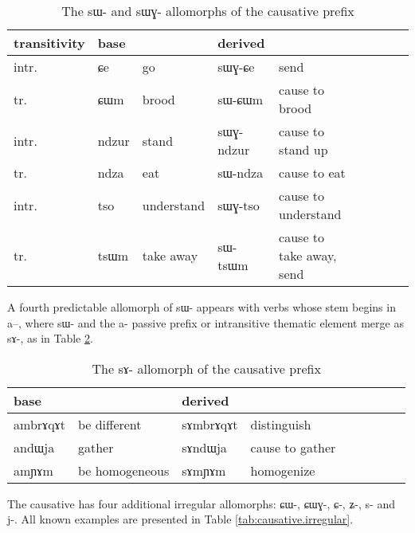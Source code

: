 \documentclass[oldfontcommands,oneside,a4paper,11pt]{article}
\newcommand{\ipa}[1]{{\phon \mbox{#1}}} %
\begin{document}
\begin{table}[h]
\caption{The \ipa{sɯ}- and  \ipa{sɯɣ-} allomorphs of the causative prefix}\label{tab:causative.sW} \centering
\begin{tabular}{lllllllll} \toprule
 transitivity & base & & derived & \\
 \midrule
 intr. & \ipa{ɕe} & go & \ipa{sɯɣ-ɕe} & send \\
  tr. & \ipa{ɕɯm} & brood & \ipa{sɯ-ɕɯm} & cause to brood \\
  intr. & \ipa{ndzur} & stand & \ipa{sɯɣ-ndzur} & cause to stand up \\
  tr. & \ipa{ndza} & eat & \ipa{sɯ-ndza} & cause to eat \\ 
    intr. & \ipa{tso} & understand & \ipa{sɯɣ-tso} & cause to understand \\
  tr. & \ipa{tsɯm} & take away & \ipa{sɯ-tsɯm} & cause to take away, send \\ 
 \bottomrule
\end{tabular}
\end{table}
 
A fourth predictable allomorph of \ipa{sɯ-} appears with   verbs whose stem begins in \ipa{a--}, where \ipa{sɯ-}  and the \ipa{a-} passive prefix or intransitive thematic element merge as \ipa{sɤ-}, as in Table \ref{tab:causative.sA}.

\begin{table}[h]
\caption{The \ipa{sɤ}-   allomorph  of the causative prefix}\label{tab:causative.sA} \centering
\begin{tabular}{lllllllll} \toprule
  base & & derived & \\
 \midrule
 \ipa{ambrɤqɤt} & be different & \ipa{sɤmbrɤqɤt} & distinguish \\
\ipa{andɯja} & gather & \ipa{sɤndɯja} & cause to gather \\
 \ipa{amɲɤm} & be homogeneous & \ipa{sɤmɲɤm} & homogenize \\
 \bottomrule
\end{tabular}
\end{table}

The causative has four additional irregular allomorphs: \ipa{ɕɯ-}, \ipa{ɕɯɣ-}, \ipa{ɕ-}, \ipa{ʑ-}, \ipa{s-} and \ipa{j-}. All known examples are presented in Table \ref{tab:causative.irregular}.
\end{document}
